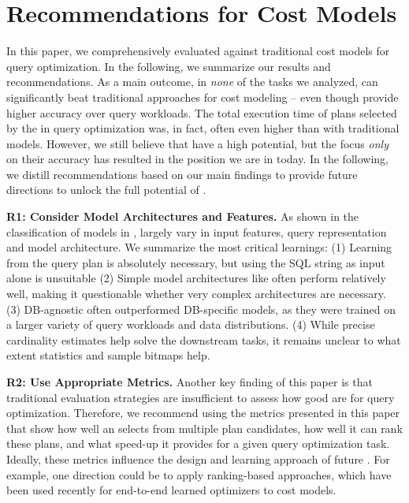 \section{Recommendations for Cost Models} \label{sec:lessons}
In this paper, we comprehensively evaluated \lcms against traditional cost models for query optimization. 
In the following, we summarize our results and recommendations.
As a main outcome, in \textit{none} of the tasks we analyzed, \lcms can significantly beat traditional approaches for cost modeling -- even though \lcms provide higher accuracy over query workloads.
The total execution time of plans selected by the \lcms in query optimization was, in fact, often even higher than with traditional models.
However, we still believe that \lcms have a high potential, but the focus \textit{only} on their accuracy has resulted in the position we are in today.
In the following, we distill recommendations based on our main findings to provide future directions to unlock the full potential of \lcms.

\noindent \textbf{R1: Consider Model Architectures and Features.}
As shown in the classification of models in , \lcms largely vary in input features, query representation and model architecture.
We summarize the most critical learnings:
(1) Learning from the query plan is absolutely necessary, but using the SQL string as input alone is unsuitable
(2) Simple model architectures like \flatvector often perform relatively well, making it questionable whether very complex architectures are necessary. 
(3) DB-agnostic \lcms often outperformed DB-specific models, as they were trained on a larger variety of query workloads and data distributions.
(4) While precise cardinality estimates help solve the downstream tasks, it remains unclear to what extent statistics and sample bitmaps help. 

\noindent \textbf{R2: Use Appropriate Metrics.}
Another key finding of this paper is that traditional evaluation strategies are insufficient to assess how good \lcms are for query optimization. 
Therefore, we recommend using the metrics presented in this paper that show how well an \lcm selects from multiple plan candidates, how well it can rank these plans, and what speed-up it provides for a given query optimization task.
Ideally, these metrics influence the design and learning approach of future \lcms.
For example, one direction could be to apply ranking-based approaches, which have been used recently for end-to-end learned optimizers \cite{behr2023, chen2023, zhu2023} to cost models.

